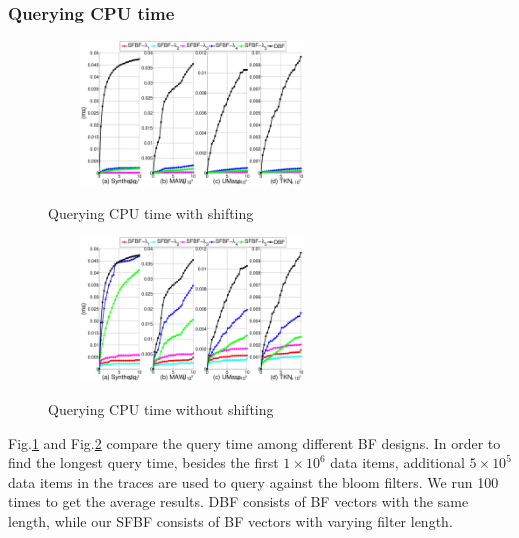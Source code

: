 \documentclass[10pt,journal,compsoc]{IEEEtran}
\newcommand{\DataSetSize}{$1 \times 10^6$ }
\newcommand{\SearchDataSize}{$5 \times 10^5$ }
\begin{document}
\subsubsection{Querying CPU time}
\begin{figure}[!h]
\center
\includegraphics[width=3in,height=1.5in]{franztao20161209/p5_QueryingCPUtimewithshifting}\\
\caption{Querying CPU time with shifting}
\label{fig:Querying CPU time with shifting.}
\end{figure}



\begin{figure}[!h]
\center
\includegraphics[width=3in,height=1.5in]{franztao20161209/p4_QueryingCPUtimewithoutshifting}\\
\caption{Querying CPU time without shifting}
\label{fig:Querying CPU time without shifting.}
\end{figure}




Fig.\ref{fig:Querying CPU time with shifting.} and Fig.\ref{fig:Querying CPU time without shifting.} compare the query time among different BF designs. In order to find the longest query time, besides the first \DataSetSize data items, additional \SearchDataSize data items in the traces are used to query against the bloom filters. We run 100 times to get the average results. DBF consists of BF vectors with the same length, while our SFBF consists of BF vectors with varying filter length.
\end{document}
